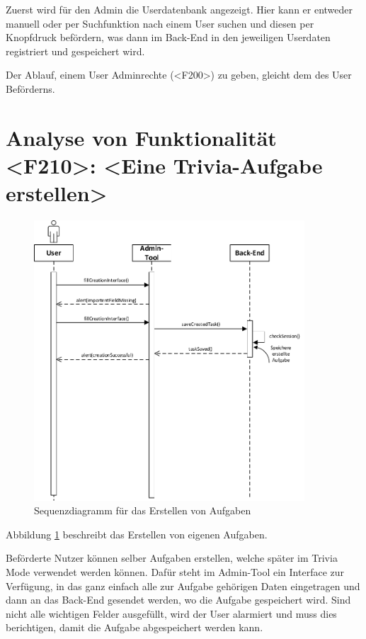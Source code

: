 Zuerst wird für den Admin die Userdatenbank angezeigt. Hier kann er entweder manuell oder per Suchfunktion nach einem User suchen und diesen per Knopfdruck befördern, was dann im Back-End in den jeweiligen Userdaten registriert und gespeichert wird. 

Der Ablauf, einem User Adminrechte (<F200>) zu geben, gleicht dem des User Bef\"orderns.

\newpage
\section{Analyse von Funktionalität <F210>: <Eine Trivia-Aufgabe erstellen>}
\begin{figure}[h]
\centering
\includegraphics[width=0.9\textwidth]{figures/sequenz_F210.pdf}
\caption{Sequenzdiagramm für das Erstellen von Aufgaben}
\label{sequence_f210}
\end{figure}
Abbildung \ref{sequence_f210} beschreibt das Erstellen von eigenen Aufgaben.

Beförderte Nutzer können selber Aufgaben erstellen, welche später im Trivia Mode verwendet werden können.
Dafür steht im Admin-Tool ein Interface zur Verfügung, in das ganz einfach alle zur Aufgabe gehörigen Daten eingetragen und dann an das Back-End gesendet werden, wo die Aufgabe gespeichert wird. Sind nicht alle wichtigen Felder ausgefüllt, wird der User alarmiert und muss dies berichtigen, damit die Aufgabe abgespeichert werden kann.

